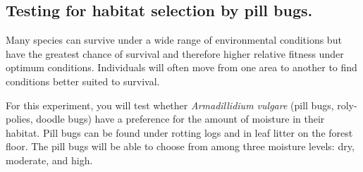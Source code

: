 \documentclass[12pt, hidelinks]{exam}
\begin{document}
\subsection*{Testing for habitat selection by pill bugs.}

Many species can survive under a wide range of environmental conditions but have the greatest chance of survival and therefore higher relative fitness under optimum conditions. Individuals will often move from one area to another to find conditions better suited to survival. 


For this experiment, you will test whether \textit{Armadillidium vulgare} (pill bugs, roly-polies, doodle bugs) have a preference for the amount of moisture in their habitat. Pill bugs can be found under rotting logs and in leaf litter on the forest floor. The pill bugs will be able to choose from among three moisture levels: dry, moderate, and high.
\end{document}
